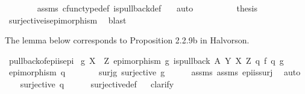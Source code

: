 \begin{isabellebody}
\ \ \ \ \ \ \isamarkupfalse%
\ assms{\isacharparenleft}{\kern0pt}{}{\isacharparenright}{\kern0pt}\ cfunc{\isacharunderscore}{\kern0pt}type{\isacharunderscore}{\kern0pt}def\ is{\isacharunderscore}{\kern0pt}pullback{\isacharunderscore}{\kern0pt}def\ \ \isamarkupfalse%
\ auto\isanewline
\ \ \isamarkupfalse%
\ \isanewline
\ \ \isamarkupfalse%
\ \isamarkupfalse%
\ {\isacharquery}{\kern0pt}thesis\isanewline
\ \ \ \ \isamarkupfalse%
\ surjective{\isacharunderscore}{\kern0pt}is{\isacharunderscore}{\kern0pt}epimorphism\ \isamarkupfalse%
\ blast\isanewline
{}\isamarkupfalse%
%
\endisatagproof
{\isafoldproof}%
%
\isadelimproof
%
\endisadelimproof
%
\begin{isamarkuptext}%
The lemma below corresponds to Proposition 2.2.9b in Halvorson.%
\end{isamarkuptext}\isamarkuptrue%
\isamarkupfalse%
\ pullback{\isacharunderscore}{\kern0pt}of{\isacharunderscore}{\kern0pt}epi{\isacharunderscore}{\kern0pt}is{\isacharunderscore}{\kern0pt}epi{}{\isacharcolon}{\kern0pt}\isanewline
{}\ {\isachardoublequoteopen}g{\isacharcolon}{\kern0pt}\ X\ {\isasymrightarrow}\ Z{\isachardoublequoteclose}\ {\isachardoublequoteopen}epimorphism\ g{\isachardoublequoteclose}\ {\isachardoublequoteopen}is{\isacharunderscore}{\kern0pt}pullback\ A\ Y\ X\ Z\ q{}\ f\ q{}\ g{\isachardoublequoteclose}\isanewline
{}\ {\isachardoublequoteopen}epimorphism\ q{}{\isachardoublequoteclose}\ \isanewline
%
\isadelimproof
%
\endisadelimproof
%
\isatagproof
{}\isamarkupfalse%
\ {\isacharminus}{\kern0pt}\ \isanewline
\ \ \isamarkupfalse%
\ surj{\isacharunderscore}{\kern0pt}g{\isacharcolon}{\kern0pt}\ {\isachardoublequoteopen}surjective\ g{\isachardoublequoteclose}\isanewline
\ \ \ \ \isamarkupfalse%
\ assms{\isacharparenleft}{\kern0pt}{}{\isacharparenright}{\kern0pt}\ assms{\isacharparenleft}{\kern0pt}{}{\isacharparenright}{\kern0pt}\ epi{\isacharunderscore}{\kern0pt}is{\isacharunderscore}{\kern0pt}surj\ \isamarkupfalse%
\ auto\isanewline
\ \ \isamarkupfalse%
\ {\isachardoublequoteopen}surjective\ q{}{\isachardoublequoteclose}\isanewline
\ \ \ \ \isamarkupfalse%
\ surjective{\isacharunderscore}{\kern0pt}def\isanewline
\ \ \isamarkupfalse%
{\isacharparenleft}{\kern0pt}clarify{\isacharparenright}{\kern0pt}\isanewline

\end{isabellebody}
